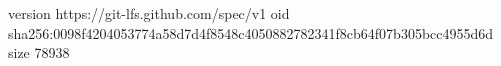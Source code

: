 version https://git-lfs.github.com/spec/v1
oid sha256:0098f4204053774a58d7d4f8548c4050882782341f8cb64f07b305bcc4955d6d
size 78938
